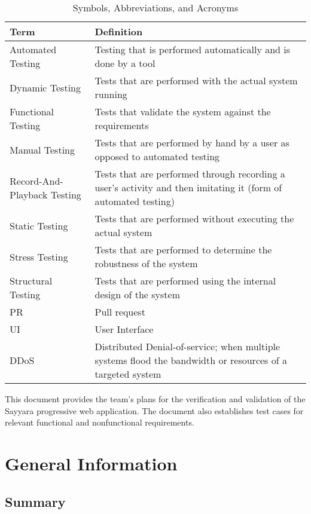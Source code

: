 \documentclass[12pt, titlepage]{article}
\begin{document}
\renewcommand{\arraystretch}{1.2}
\begin{table}[h!]
    \begin{tabularx}{\textwidth}{|l|X|}
    \hline
    Term & Definition\\ 
    \hline
    Automated Testing & Testing that is performed automatically and is done by a tool \\ \hline
    Dynamic Testing & Tests that are performed with the actual system running \\ \hline
    Functional Testing & Tests that validate the system against the requirements \\ \hline
    Manual Testing & Tests that are performed by hand by a user as opposed to automated testing  \\ \hline
    Record-And-Playback Testing & Tests that are performed through recording a user's activity and then imitating it (form of automated testing) \\ \hline
    Static Testing & Tests that are performed without executing the actual system \\ \hline
    Stress Testing & Tests that are performed to determine the robustness of the system \\ \hline
    Structural Testing & Tests that are performed using the internal design of the system \\ \hline
    PR & Pull request \\ \hline
    UI & User Interface \\ \hline
    DDoS & Distributed Denial-of-service; when multiple systems flood the bandwidth or resources of a targeted system \\ \hline
    \end{tabularx}
    \caption{Symbols, Abbreviations, and Acronyms}
\end{table}

\noindent This document provides the team's plans for the verification and validation of the Sayyara progressive web application. The document also establishes test cases for relevant functional and nonfunctional requirements.

\section{General Information}

\subsection{Summary}
  
\end{document}
